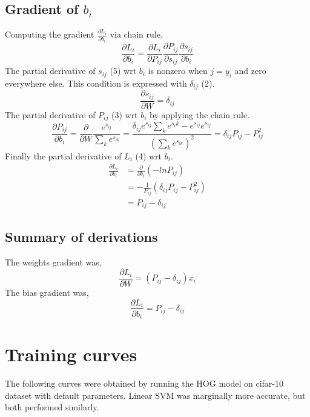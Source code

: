 \documentclass[12pt, letter]{article}
\begin{document}
{\subsection{Gradient of $b_i$}
Computing the gradient $\frac{\partial L_i}{\partial b_i}$ via chain rule.
\begin{equation}\nonumber
  \frac{\partial L_i}{\partial b_i} =
  \frac{\partial L_i}{\partial P_{ij}} \frac{\partial P_{ij}}{\partial s_{ij}} \frac{\partial s_{ij}}{\partial b_i}
\end{equation}
The partial derivative of $s_{ij}$ (5) wrt $b_i$ is nonzero when $j=y_i$
and zero everywhere else. This condition is expressed with $\delta_{ij}$ (2).
\begin{equation}\nonumber
  \frac{\partial s_{ij}}{\partial W} = \delta_{ij}
\end{equation}
The partial derivative of $P_{ij}$ (3) wrt $b_i$ by applying the chain rule.
\begin{equation}\nonumber
  \frac{\partial P_{ij}}{\partial b_i} = \frac{\partial}{\partial W}\frac{e^{s_{ij}}}{\sum_ke^{s_{ik}}} = \frac{\delta_{ij} e^{s_{ij}} \sum_ke^{s_ik}-e^{s_{ij}}e^{s_{ij}}}{\left(\sum_ke^{s_{ik}}\right)^2} = \delta_{ij}P_{ij}-P_{ij}^2
\end{equation}
Finally the partial derivative of $L_i$ (4) wrt $b_i$.
\begin{equation}
\begin{split}
  \frac{\partial L_i}{\partial b_i}& = \frac{\partial}{\partial b_i}\left(-lnP_{ij}\right)\\
  & = -\frac{1}{P_{ij}} (\delta_{ij}P_{ij}-P_{ij}^2) \\
  & = P_{ij} - \delta_{ij}
\end{split}
\end{equation}

\subsection{Summary of derivations}
The weights gradient was,
\begin{equation}\nonumber\frac{\partial L_i}{\partial W} = (P_{ij} -
  \delta_{ij}) x_i \end{equation}
The bias gradient was,
\begin{equation}\nonumber\frac{\partial L_i}{\partial b_i} = P_{ij} - \delta_{ij}\end{equation}

\pagebreak

\section{Training curves}
The following curves were obtained by running the HOG model on cifar-10 dataset
with default parameters. Linear SVM was marginally more accurate, but both
performed similarly.
}
\end{document}
